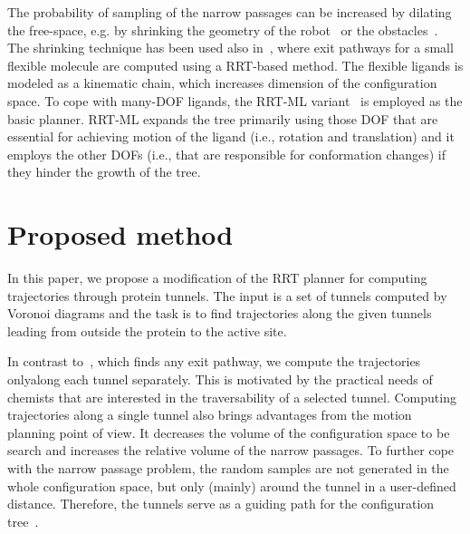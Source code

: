 \documentclass[usletter, 10pt, conference]{ieeeconf} %
\begin{document}
The probability of sampling of the narrow passages can be increased by dilating the free-space, e.g. by shrinking the geometry of 
the robot~\cite{hsuOnProb} or the obstacles~\cite{bayazitIRC}.
The shrinking technique has been used also in~\cite{cortes2010simulating}, where exit pathways for a small flexible molecule are
computed using a RRT-based method.
The flexible ligands is modeled as a kinematic chain, which increases dimension of the configuration space.
To cope with many-DOF ligands, the RRT-ML variant~\cite{cortes2007mlrrt} is employed as the basic planner.
RRT-ML expands the tree primarily using those DOF that are essential for achieving motion of the ligand (i.e., rotation
and translation) and it employs the other DOFs (i.e., that are responsible for conformation changes) if they hinder the growth of the tree.




\section{Proposed method}


In this paper, we propose a modification of the RRT planner for computing trajectories through protein tunnels.
The input is a set of tunnels computed by Voronoi diagrams and the task is to find trajectories along the given tunnels
leading from outside the protein to the active site.

In contrast to~\cite{cortes2010simulating}, which finds any exit pathway, we compute the trajectories onlyalong each tunnel separately.
This is motivated by the practical needs of chemists that are interested in the traversability of a selected tunnel.
Computing trajectories along a single tunnel also brings advantages from the motion planning point of view.
It decreases the volume of the configuration space to be search and increases the relative volume of the narrow passages.
To further cope with the narrow passage problem, the random samples are not generated in the whole configuration space, but only (mainly) around
the tunnel in a user-defined distance.
Therefore, the tunnels serve as a guiding path for the configuration tree~\cite{vonasek2009rrt}.
\end{document}
